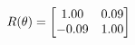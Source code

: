 \documentclass[preview]{standalone}
\begin{document}
\begin{align*}
\special{dvisvgm:raw <g id='unique000'>}R(\theta) = \begin{bmatrix}1.00 & 0.09\\-0.09 & 1.00\end{bmatrix}\special{dvisvgm:raw </g>}
\end{align*}
\end{document}
